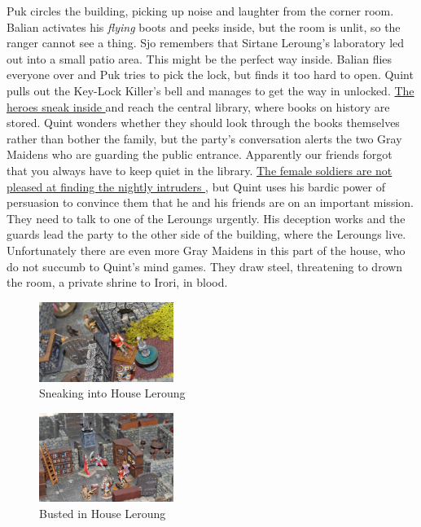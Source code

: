 Puk circles the building, picking up noise and laughter from the corner room. Balian activates his {\itshape flying} boots and peeks inside, but the room is unlit, so the ranger cannot see a thing. Sjo remembers that Sirtane Leroung's laboratory led out into a small patio area. This might be the perfect way inside. Balian flies everyone over and Puk tries to pick the lock, but finds it too hard to open. Quint pulls out the Key-Lock Killer's bell and manages to get the way in unlocked. \hyperref[fig:Sneaking-into-House-Leroung-607544485]{ The heroes sneak inside } and reach the central library, where books on history are stored. Quint wonders whether they should look through the books themselves rather than bother the family, but the party's conversation alerts the two Gray Maidens who are guarding the public entrance. Apparently our friends forgot that you always have to keep quiet in the library. \hyperref[fig:Busted-in-House-Leroung-607546219]{ The female soldiers are not pleased at finding the nightly intruders } , but Quint uses his bardic power of persuasion to convince them that he and his friends are on an important mission. They need to talk to one of the Leroungs urgently. His deception works and the guards lead the party to the other side of the building, where the Leroungs live. Unfortunately there are even more Gray Maidens in this part of the house, who do not succumb to Quint's mind games. They draw steel, threatening to drown the room, a private shrine to Irori, in blood. \\

\begin{figure}[h]
	\centering
	\includegraphics[width=0.39\textwidth]{images/Sneaking-into-House-Leroung-607544485.jpg}
	\caption{Sneaking into House Leroung}
	\label{fig:Sneaking-into-House-Leroung-607544485}
\end{figure}

\begin{figure}[h]
	\centering
	\includegraphics[width=0.39\textwidth]{images/Busted-in-House-Leroung-607546219.jpg}
	\caption{Busted in House Leroung}
	\label{fig:Busted-in-House-Leroung-607546219}
\end{figure}

